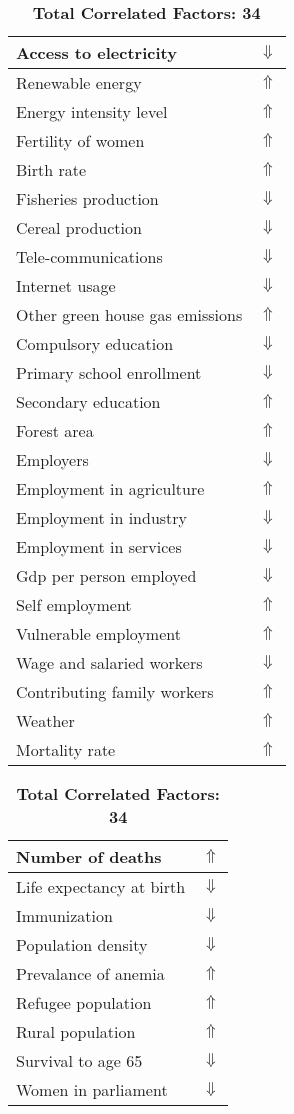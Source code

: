 \documentclass[12pt,notitlepage,oneside]{report}
\begin{document}
\begin{table}[!htb]
\caption{\textbf{Shows Symptom: Diarrhoea $\Uparrow$}}
\centering
\label{Correlated Socio-economic Factors0}
\begin{tabular}{|l|l|}
\hline
Access to electricity & $\Downarrow$\\ \hline
Renewable energy & $\Uparrow$\\ \hline
Energy intensity level & $\Uparrow$\\ \hline
Fertility of women & $\Uparrow$\\ \hline
Birth rate & $\Uparrow$\\ \hline
Fisheries production & $\Downarrow$\\ \hline
Cereal production & $\Downarrow$\\ \hline
Tele-communications & $\Downarrow$\\ \hline
Internet usage & $\Downarrow$\\ \hline
Other green house gas emissions & $\Uparrow$\\ \hline
Compulsory education & $\Downarrow$\\ \hline
Primary school enrollment & $\Downarrow$\\ \hline
Secondary education & $\Uparrow$\\ \hline
Forest area & $\Uparrow$\\ \hline
Employers & $\Downarrow$\\ \hline
Employment in agriculture & $\Uparrow$\\ \hline
Employment in industry & $\Downarrow$\\ \hline
Employment in services & $\Downarrow$\\ \hline
Gdp per person employed & $\Downarrow$\\ \hline
Self employment & $\Uparrow$\\ \hline
Vulnerable employment & $\Uparrow$\\ \hline
Wage and salaried workers & $\Downarrow$\\ \hline
Contributing family workers & $\Uparrow$\\ \hline
Weather & $\Uparrow$\\ \hline
Mortality rate & $\Uparrow$\\ \hline
\end{tabular}
\begin{tabular}{|l|l|}
\hline
Number of deaths & $\Uparrow$\\ \hline
Life expectancy at birth & $\Downarrow$\\ \hline
Immunization & $\Downarrow$\\ \hline
Population density & $\Downarrow$\\ \hline
Prevalance of anemia & $\Uparrow$\\ \hline
Refugee population & $\Uparrow$\\ \hline
Rural population & $\Uparrow$\\ \hline
Survival to age 65 & $\Downarrow$\\ \hline
Women in parliament & $\Downarrow$\\ \hline
\end{tabular}
\caption*{\textbf{Total Correlated Factors: 34}}
\end{table}
\end{document}
